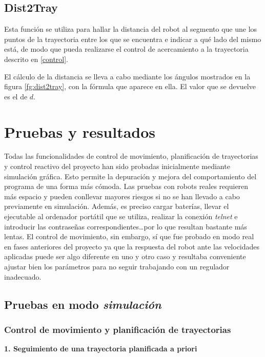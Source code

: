 \subsection{Dist2Tray}

\noindent
{}

\noindent
Esta función se utiliza para hallar la distancia del robot al segmento que une los puntos de la trayectoria entre los que se encuentra e indicar a qué lado del mismo está, de modo que pueda realizarse el control de acercamiento a la trayectoria descrito en \ref{control}.

\noindent
El cálculo de la distancia se lleva a cabo mediante los ángulos mostrados en la figura \ref{fg:dist2tray}, con la fórmula que aparece en ella. El valor que se devuelve es el de $d$.


\section{Pruebas y resultados}
Todas las funcionalidades de control de movimiento, planificación de trayectorias y control reactivo del proyecto han sido probadas inicialmente mediante simulación gráfica. Esto permite la depuración y mejora del comportamiento del programa de una forma más cómoda. Las pruebas con robots reales requieren más espacio y pueden conllevar mayores riesgos si no se han llevado a cabo previamente en simulación. Además, es preciso cargar baterías, llevar el ejecutable al ordenador portátil que se utiliza, realizar la conexión \emph{telnet} e introducir las contraseñas correspondientes\ldots por lo que resultan bastante más lentas. El control de movimiento, sin embargo, sí que fue probado en modo real en fases anteriores del proyecto ya que la respuesta del robot ante las velocidades aplicadas puede ser algo diferente en uno y otro caso y resultaba conveniente ajustar bien los parámetros para no seguir trabajando con un regulador inadecuado.

\subsection{Pruebas en modo \emph{simulación}}

\subsubsection{Control de movimiento y planificación de trayectorias}

\noindent
\textbf{\textbf{1.} Seguimiento de una trayectoria planificada a priori}

